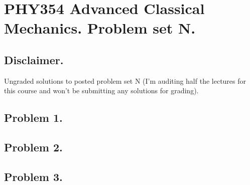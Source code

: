 
%

\chapter{PHY354 Advanced Classical Mechanics.  Problem set {N}.}
\label{chap:classicalMechanicsPs1}
{}
\date{Mar XX, 2012}

\beginArtWithToc

\section{Disclaimer.}

Ungraded solutions to posted problem set {N} (I'm auditing half the lectures for this course and won't be submitting any solutions for grading).

\section{Problem 1.}
\section{Problem 2.}
\section{Problem 3.}

\EndNoBibArticle
